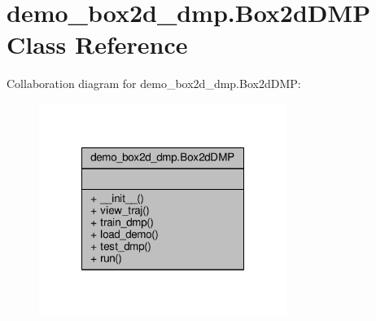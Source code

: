 \hypertarget{classdemo__box2d__dmp_1_1_box2d_d_m_p}{\section{demo\-\_\-box2d\-\_\-dmp.\-Box2d\-D\-M\-P Class Reference}
\label{classdemo__box2d__dmp_1_1_box2d_d_m_p}
}


Collaboration diagram for demo\-\_\-box2d\-\_\-dmp.\-Box2d\-D\-M\-P\-:\nopagebreak
\begin{figure}[H]
\begin{center}
\leavevmode
\includegraphics[width=228pt]{classdemo__box2d__dmp_1_1_box2d_d_m_p__coll__graph}
\end{center}
\end{figure}
